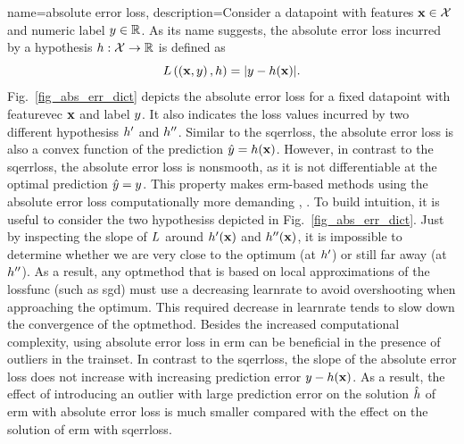 {name={absolute error loss},
	description={Consider a \gls{datapoint} with \glspl{feature} ${\bf x} \in \mathcal{X}$ and numeric 
		\gls{label} $y \in \mathbb{R}$. As its name suggests, the absolute error \gls{loss} 
		incurred by a \gls{hypothesis} $h: \mathcal{X} \rightarrow \mathbb{R}$ 
		is defined as $$L\left(\left( {\bf x},y \right),h \right) = |y - h({\bf x})|.$$
		Fig.\ \ref{fig_abs_err_dict} depicts the absolute error \gls{loss} for a fixed \gls{datapoint} 
		with \gls{featurevec} ${\bf x}$ and \gls{label} $y$. It also indicates the \gls{loss} values 
		incurred by two different \glspl{hypothesis} $h'$ and $h''$. Similar to the \gls{sqerrloss}, 
		the absolute error \gls{loss} is also a \gls{convex} \gls{function} of the \gls{prediction} $\hat{y}=h({\bf x})$. 
		However, in contrast to the \gls{sqerrloss}, the absolute error \gls{loss} is \gls{nonsmooth}, as it is not 
		\gls{differentiable} at the optimal \gls{prediction} $\hat{y}=y$. This property 
		makes \gls{erm}-based methods using the absolute error \gls{loss} computationally more demanding \cite{nesterov04}, \cite{OptMLBook}. 
	    	To build intuition, it is useful to consider the two \glspl{hypothesis} depicted in Fig.\ \ref{fig_abs_err_dict}. 
	    	Just by inspecting the slope of $L$ around $h'({\bf x})$ and $h''({\bf x})$,
	     	it is impossible to determine whether we are very close to the optimum (at $h'$) or still far away (at $h''$). 
	     	As a result, any \gls{optmethod} that is based on local approximations of the \gls{lossfunc} (such as \gls{sgd}) 
	     	must use a decreasing \gls{learnrate} to avoid overshooting when approaching the optimum. This required 
	     	decrease in \gls{learnrate} tends to slow down the \gls{convergence} of the 
	     	\gls{optmethod}. Besides the increased computational complexity, using absolute error \gls{loss} in \gls{erm} can 
	     	be beneficial in the presence of \glspl{outlier} in the \gls{trainset}. In contrast to the \gls{sqerrloss}, 
	     	the slope of the absolute error \gls{loss} does not increase with increasing \gls{prediction} error 
	     	$y - h({\bf x})$. As a result, the effect of introducing an \gls{outlier} with 
	     	large \gls{prediction} error on the solution $\hat{h}$ of \gls{erm} with absolute error \gls{loss} 
	     	is much smaller compared with the effect on the solution of \gls{erm} with \gls{sqerrloss}. 
}}
